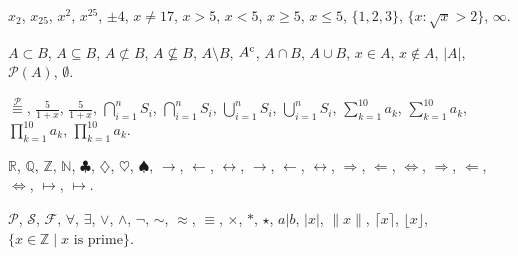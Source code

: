 \documentclass[12pt]{article}
\begin{document}
\begin{enumerate}
$x_2$,
$x_{25}$, %
$x^2$,
$x^{25}$, %
$\pm 4$,
$x \not = 17$, %
$x > 5$,
$x < 5$,
$x \geq 5$,
$x \leq 5$,
$\{ 1, 2, 3 \}$, %
$\{ x : \sqrt{x} > 2 \}$, $\infty$.
\vspace{.5\baselineskip}

$A \subset B$,
$A \subseteq B$,
$A \not \subset B$,
$A \not \subseteq B$,
$A \setminus B$,
$A^{\rm c}$, %
$A \cap B$,
$A \cup B$,
$x \in A$,
$x \not \in A$,
$|A|$,
$\mathcal{P}(A)$,
$\emptyset$.
\vspace{.5\baselineskip}

$\overset{\mathcal{P}}{\equiv}$,
$\frac{5}{1+x}$,
$\displaystyle\frac{5}{1+x}$, %
$\bigcap_{i=1}^n S_i$,
$\displaystyle\bigcap_{i=1}^n S_i$,
$\bigcup_{i=1}^n S_i$,
$\displaystyle\bigcup_{i=1}^n S_i$,
$\sum_{k=1}^{10} a_k$,
$\displaystyle\sum_{k=1}^{10} a_k$,
$\prod_{k=1}^{10} a_k$,
$\displaystyle\prod_{k=1}^{10} a_k$.
\vspace{.5\baselineskip}

$\mathbb{R}$, %
$\mathbb{Q}$, %
$\mathbb{Z}$, %
$\mathbb{N}$, %
$\clubsuit$,
$\diamondsuit$,
$\heartsuit$,
$\spadesuit$,
$\rightarrow$,
$\leftarrow$,
$\leftrightarrow$,
$\longrightarrow$,
$\longleftarrow$,
$\longleftrightarrow$,
$\Rightarrow$, %
$\Leftarrow$,
$\Leftrightarrow$, %
$\Longrightarrow$, %
$\Longleftarrow$,
$\Longleftrightarrow$, %
$\mapsto$,
$\longmapsto$.
\vspace{.5\baselineskip}

$\mathcal{P}$, %
$\mathcal{S}$,
$\mathcal{F}$,
$\forall$,
$\exists$,
$\lor$, %
$\land$, %
$\neg$, %
$\sim$, %
$\approx$,
$\equiv$,
$\times$, %
$\ast$,
$\star$,
$a | b$, %
$|x|$, %
$\|x\|$,
$\lceil x \rceil$,
$\lfloor x \rfloor$,
$\{x \in \mathbb{Z} \mid x \mbox{ is prime} \}$. %
\vspace{.5\baselineskip}


\end{enumerate}
\end{document}
